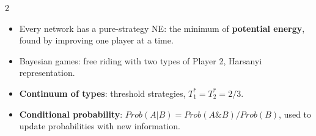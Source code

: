 \documentclass[a4paper,9pt]{extarticle}
\begin{document}
\begin{multicols}{2}
\begin{summary}
\begin{itemize}
\item Every network has a pure-strategy NE: the minimum of \textbf{potential energy}, found by
improving one player at a time.

\item Bayesian games: free riding with two types of Player 2, Harsanyi representation.

\item \textbf{Continuum of types}: threshold strategies, $T_1^* = T_2^* = 2/3$.

\item \textbf{Conditional probability}: $Prob(A|B) = Prob(A \& B) / Prob(B)$, used to update
probabilities with new information.

\end{itemize}

\end{summary}



\end{multicols}
\end{document}
